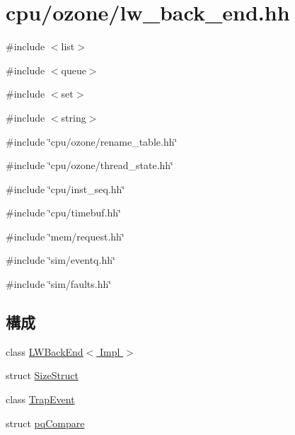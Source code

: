 \hypertarget{lw__back__end_8hh}{
\section{cpu/ozone/lw\_\-back\_\-end.hh}
\label{lw__back__end_8hh}
}
{\ttfamily \#include $<$list$>$}\par
{\ttfamily \#include $<$queue$>$}\par
{\ttfamily \#include $<$set$>$}\par
{\ttfamily \#include $<$string$>$}\par
{\ttfamily \#include \char`\"{}cpu/ozone/rename\_\-table.hh\char`\"{}}\par
{\ttfamily \#include \char`\"{}cpu/ozone/thread\_\-state.hh\char`\"{}}\par
{\ttfamily \#include \char`\"{}cpu/inst\_\-seq.hh\char`\"{}}\par
{\ttfamily \#include \char`\"{}cpu/timebuf.hh\char`\"{}}\par
{\ttfamily \#include \char`\"{}mem/request.hh\char`\"{}}\par
{\ttfamily \#include \char`\"{}sim/eventq.hh\char`\"{}}\par
{\ttfamily \#include \char`\"{}sim/faults.hh\char`\"{}}\par
\subsection*{構成}
\begin{DoxyCompactItemize}
\item 
class \hyperlink{classLWBackEnd}{LWBackEnd$<$ Impl $>$}
\item 
struct \hyperlink{structLWBackEnd_1_1SizeStruct}{SizeStruct}
\item 
class \hyperlink{classLWBackEnd_1_1TrapEvent}{TrapEvent}
\item 
struct \hyperlink{structLWBackEnd_1_1pqCompare}{pqCompare}
\end{DoxyCompactItemize}
